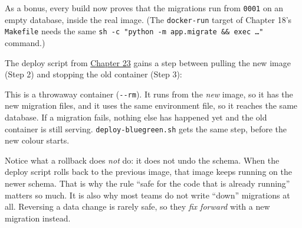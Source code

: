\noindent{}As a bonus, every build now proves that the migrations run from \texttt{0001} on an empty database, inside the real image. (The \texttt{docker-run} target of Chapter 18's \texttt{Makefile} needs the same \texttt{sh\ -}\allowbreak{}\texttt{c\ "python\ -}\allowbreak{}\texttt{m\ app.}\allowbreak{}\texttt{migrate\ \&}\allowbreak{}\texttt{\&}\allowbreak{}\texttt{\ exec\ …"} command.)

The deploy script from \hyperref[ch:23-code-transfer]{Chapter 23} gains a step between pulling the new image (Step 2) and stopping the old container (Step 3):

\begin{codebox}[short]

\begin{Shaded}
\begin{Highlighting}[]

 
   \DataTypeTok{\textbackslash{}}
    \OperatorTok{\textgreater{}\textgreater{}}  \OperatorTok{\textgreater{}\&} \DataTypeTok{\textbackslash{}}
    \KeywordTok{||}  
 
\end{Highlighting}
\end{Shaded}

\end{codebox}

\noindent{}This is a throwaway container (\texttt{-\/-rm}). It runs from the \emph{new} image, so it has the new migration files, and it uses the same environment file, so it reaches the same database. If a migration fails, nothing else has happened yet and the old container is still serving. \texttt{deploy-bluegreen.sh} gets the same step, before the new colour starts.

Notice what a rollback does \emph{not} do: it does not undo the schema. When the deploy script rolls back to the previous image, that image keeps running on the newer schema. That is why the rule ``safe for the code that is already running'' matters so much. It is also why most teams do not write ``down'' migrations at all. Reversing a data change is rarely safe, so they \emph{fix forward} with a new migration instead.

